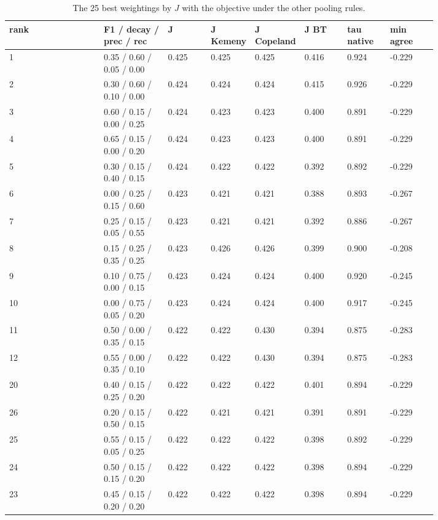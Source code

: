 \begin{table}[htbp]
\centering\tiny
\caption{The 25 best weightings by $J$ with the objective under the other pooling rules.}
\label{tab:grid_top25}
\setlength{\tabcolsep}{3pt}
\begin{tabular}{lp{0.151\linewidth}p{0.109\linewidth}p{0.109\linewidth}p{0.109\linewidth}p{0.109\linewidth}p{0.109\linewidth}p{0.115\linewidth}}
\toprule
rank & F1 / decay / prec / rec & J & J Kemeny & J Copeland & J BT & tau native & min agree \\
\midrule
1 & 0.35 / 0.60 / 0.05 / 0.00 & 0.425 & 0.425 & 0.425 & 0.416 & 0.924 & -0.229 \\
2 & 0.30 / 0.60 / 0.10 / 0.00 & 0.424 & 0.424 & 0.424 & 0.415 & 0.926 & -0.229 \\
3 & 0.60 / 0.15 / 0.00 / 0.25 & 0.424 & 0.423 & 0.423 & 0.400 & 0.891 & -0.229 \\
4 & 0.65 / 0.15 / 0.00 / 0.20 & 0.424 & 0.423 & 0.423 & 0.400 & 0.891 & -0.229 \\
5 & 0.30 / 0.15 / 0.40 / 0.15 & 0.424 & 0.422 & 0.422 & 0.392 & 0.892 & -0.229 \\
6 & 0.00 / 0.25 / 0.15 / 0.60 & 0.423 & 0.421 & 0.421 & 0.388 & 0.893 & -0.267 \\
7 & 0.25 / 0.15 / 0.05 / 0.55 & 0.423 & 0.421 & 0.421 & 0.392 & 0.886 & -0.267 \\
8 & 0.15 / 0.25 / 0.35 / 0.25 & 0.423 & 0.426 & 0.426 & 0.399 & 0.900 & -0.208 \\
9 & 0.10 / 0.75 / 0.00 / 0.15 & 0.423 & 0.424 & 0.424 & 0.400 & 0.920 & -0.245 \\
10 & 0.00 / 0.75 / 0.05 / 0.20 & 0.423 & 0.424 & 0.424 & 0.400 & 0.917 & -0.245 \\
11 & 0.50 / 0.00 / 0.35 / 0.15 & 0.422 & 0.422 & 0.430 & 0.394 & 0.875 & -0.283 \\
12 & 0.55 / 0.00 / 0.35 / 0.10 & 0.422 & 0.422 & 0.430 & 0.394 & 0.875 & -0.283 \\
20 & 0.40 / 0.15 / 0.25 / 0.20 & 0.422 & 0.422 & 0.422 & 0.401 & 0.894 & -0.229 \\
26 & 0.20 / 0.15 / 0.50 / 0.15 & 0.422 & 0.421 & 0.421 & 0.391 & 0.891 & -0.229 \\
25 & 0.55 / 0.15 / 0.05 / 0.25 & 0.422 & 0.422 & 0.422 & 0.398 & 0.892 & -0.229 \\
24 & 0.50 / 0.15 / 0.15 / 0.20 & 0.422 & 0.422 & 0.422 & 0.398 & 0.894 & -0.229 \\
23 & 0.45 / 0.15 / 0.20 / 0.20 & 0.422 & 0.422 & 0.422 & 0.398 & 0.894 & -0.229 \\

\end{tabular}
\end{table}
